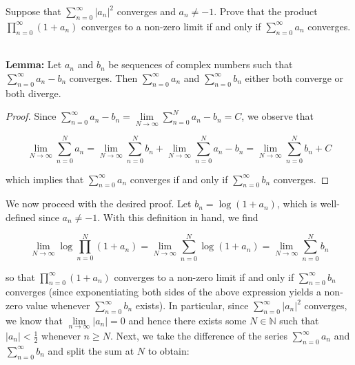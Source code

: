 Suppose that $\sum\limits_{n=0}^{\infty} |a_n|^2$ converges and $a_n \neq -1$. Prove that the product 
$\prod\limits_{n=0}^{\infty} (1 + a_n)$ converges to a non-zero limit if and only if $\sum\limits_{n=0}^{\infty} a_n$ 
converges.

\begin{solution}
  \ \\
  
  \textbf{Lemma: } Let $a_n$ and $b_n$ be sequences of complex numbers such that $\sum\limits_{n=0}^{\infty} a_n - b_n$ 
  converges. Then $\sum\limits_{n=0}^{\infty} a_n$ and $\sum\limits_{n=0}^{\infty} b_n$ either both converge or both 
  diverge.

  \begin{proof}
    Since $\sum\limits_{n=0}^{\infty} a_n - b_n = \lim\limits_{N \to \infty} \sum\limits_{n=0}^{N} a_n - b_n = C$, we 
    observe that

    $$
    \lim_{N \to \infty} \sum_{n=0}^{N} a_n = \lim_{N \to \infty} \sum_{n=0}^{N} b_n 
                                             + \lim_{N \to \infty} \sum_{n=0}^{N} a_n - b_n
                                           = \lim_{N \to \infty} \sum_{n=0}^{N} b_n + C
    $$

    which implies that $\sum\limits_{n=0}^{\infty} a_n$ converges if and only if $\sum\limits_{n=0}^{\infty} b_n$ 
    converges.
  \end{proof}

  We now proceed with the desired proof. Let $b_n = \log(1 + a_n)$, which is well-defined since $a_n \neq -1$. With this
  definition in hand, we find

  $$
  \lim\limits_{N \to \infty} \log{\prod_{n=0}^{N} (1 + a_n)} 
    = \lim\limits_{N \to \infty}\sum_{n = 0}^{N} \log{(1 + a_n)} 
    = \lim\limits_{N \to \infty}\sum_{n = 0}^{N} b_n
  $$
  
  so that $\prod\limits_{n=0}^{\infty} \left(1 + a_n\right)$ converges to a non-zero limit if and only if 
  $\sum\limits_{n=0}^{\infty} b_n$ converges (since exponentiating both sides of the above expression yields a non-zero
  value whenever $\sum\limits_{n=0}^{\infty} b_n$ exists). In particular, since $\sum\limits_{n=0}^{\infty} |a_n|^2$ 
  converges, we know that $\lim\limits_{n \to \infty} |a_n| = 0$ and hence there exists some $N \in \mathbb{N}$ such 
  that $|a_n| < \frac{1}{2}$ whenever $n \ge N$. Next, we take the difference of the series 
  $\sum\limits_{n=0}^{\infty} a_n$ and $\sum\limits_{n=0}^{\infty} b_n$ and split the sum at $N$ to obtain:


\end{solution}
